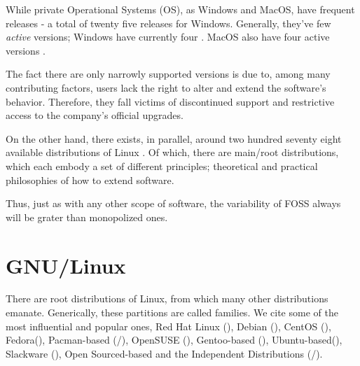 \documentclass[
12pt,				%
openright,			%
oneside,			%
a4paper,			%
brazil,				%
english,			%
]{abntex2}
\begin{document}

While private Operational Systems (OS), as Windows and MacOS, have
frequent releases - a total of twenty five releases for
Windows. Generally, they've few \textit{active} versions; Windows have
currently four \cite{wikipedia_2021W}. MacOS also have four active
versions \cite{wikipedia_2021Mac}.


The fact there are only narrowly supported versions is due to, among
many contributing factors, users lack the right to alter and extend
the software's behavior. Therefore, they fall victims of discontinued
support and restrictive access to the company's official upgrades. 

On the other hand, there exists, in parallel, around two hundred
seventy eight available distributions of Linux
\cite{wikipedia_2021Linux}. Of which, there are main/root
distributions, which each embody a set of different principles; theoretical and practical philosophies of how to extend software.  

Thus, just as with any other scope of software, the variability of
FOSS always will be grater than monopolized ones.

\section{GNU/Linux}
There are root distributions of Linux, from which many other
distributions emanate. Generically, these partitions are called
families. We cite some of the most influential and popular ones, Red
Hat Linux (), Debian (), CentOS
(), Fedora(), Pacman-based
(/), OpenSUSE (),
Gentoo-based (), Ubuntu-based(),
Slackware (), Open Sourced-based and the
Independent Distributions (/).
\end{document}
